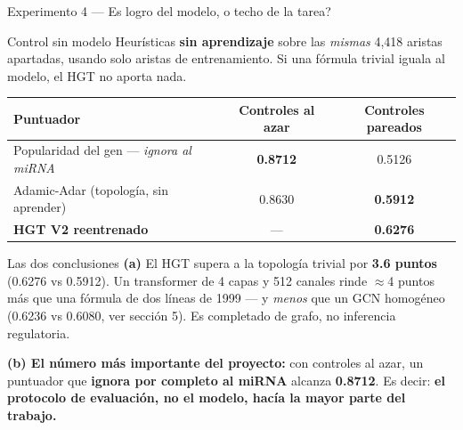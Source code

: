 
\begin{frame}{Experimento 4 --- \textquestiondown{}Es logro del modelo, o techo de la tarea?}
  \begin{block}{Control sin modelo}
    \scriptsize
    Heur\'isticas \textbf{sin aprendizaje} sobre las \emph{mismas} 4,418 aristas apartadas, usando solo aristas de entrenamiento. Si una f\'ormula trivial iguala al modelo, el HGT no aporta nada.
  \end{block}

  \vspace{0.2em}
  \centering
  \scriptsize
  \begin{tabular}{lcc}
    \toprule
    \textbf{Puntuador} & \textbf{Controles al azar} & \textbf{Controles pareados} \\
    \midrule
    Popularidad del gen --- \emph{ignora al miRNA} & \textbf{0.8712} & 0.5126 \\
    Adamic-Adar (topolog\'ia, sin aprender) & 0.8630 & \textbf{0.5912} \\
    \textbf{HGT V2 reentrenado} & --- & \textbf{0.6276} \\
    \bottomrule
  \end{tabular}

  \vspace{0.4em}
  \raggedright
  \begin{block}{Las dos conclusiones}
    \scriptsize
    \textbf{(a)} El HGT supera a la topolog\'ia trivial por \textbf{3.6 puntos} (0.6276 vs 0.5912). Un transformer de 4 capas y 512 canales rinde $\approx$4 puntos m\'as que una f\'ormula de dos l\'ineas de 1999 --- y \emph{menos} que un GCN homog\'eneo (0.6236 vs 0.6080, ver secci\'on 5). Es completado de grafo, no inferencia regulatoria.

    \vspace{0.2em}
    \textbf{(b) El n\'umero m\'as importante del proyecto:} con controles al azar, un puntuador que \textbf{ignora por completo al miRNA} alcanza \textbf{0.8712}. Es decir: \textbf{el protocolo de evaluaci\'on, no el modelo, hac\'ia la mayor parte del trabajo.}
  \end{block}
\end{frame}

